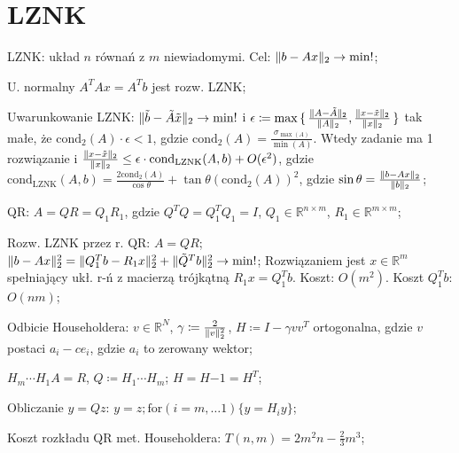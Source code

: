 \section{LZNK}

\entry
LZNK: układ $n$ równań z $m$ niewiadomymi.
Cel: $\|b - Ax\|_2 \to \min !$;

\entry
U. normalny
$A^TAx=A^Tb$
jest rozw. LZNK;

\entry
Uwarunkowanie LZNK:
$\|\tilde{b} - \tilde{A}\tilde{x}\|_2 \to \mathrm{min}!$
i $\epsilon\coloneqq \max\set{ \frac{\|A - \tilde{A}\|_2}{\|A\|_2}, \frac{\|x - \tilde{x}\|_2}{\|x\|_2} }$
tak małe, że $\mathrm{cond}_2(A)\cdot \epsilon < 1$,
gdzie $\mathrm{cond}_2(A) = \frac{\sigma_{\max(A)}}{\min(A)}$.
Wtedy zadanie ma 1 rozwiązanie i
$\frac{\|x-\tilde{x}\|_2}{\|x\|_2} \leq  \epsilon \cdot \mathrm{cond}_{\mathrm{LZNK}}(A,b)+ O(\epsilon^2)$,
gdzie $\mathrm{cond}_{\mathrm{LZNK}}(A,b) = \frac{2\mathrm{cond}_2(A)}{\cos\theta} + \tan\theta(\mathrm{cond}_2(A))^2$,
gdzie $\sin\theta=\frac{\|b-Ax\|_2}{\|b\|_2}$;

\entry
QR:
$A = QR = Q_1R_1$,
gdzie
$Q^TQ=Q^T_1Q_1=I$,
$Q_1\in\mathbb{R}^{n\times m}$,
$R_1\in\mathbb{R}^{m\times m}$;

\entry
Rozw. LZNK przez r. QR:
$A=QR$;
$\|b-Ax\|^2_2 = \|Q^T_1b-R_1x\|^2_2 + \|\tilde{Q}^Tb\|^2_2 \to \min !$;
Rozwiązaniem jest $x\in \mathbb{R}^m$ spełniający ukł. r-ń z macierzą trójkątną $R_1x=Q_1^Tb$.
Koszt: $O(m^2)$.
Koszt $Q_1^Tb$: $O(nm)$;


\entry
Odbicie Householdera:
$v\in \mathbb{R}^N$,
$\gamma \coloneqq \frac{2}{\|v\|^2_2} $,
$H\coloneqq I-\gamma vv^T$ ortogonalna, gdzie
$v$ postaci $a_i-ce_i$,
gdzie $a_i$ to zerowany wektor;

\entry
$H_m \cdots H_1 A = R$, $Q \coloneqq H_1 \cdots H_m$;
\entry
$H=H{-1}=H^T$;

\entry
Obliczanie $y=Qz$:
$y=z; \mathrm{for}(i=m,\ldots 1)\{y=H_iy\}$;

\entry
Koszt rozkładu QR met. Householdera: $T(n,m)=2m^2n - \frac{2}{3}m^3$;

